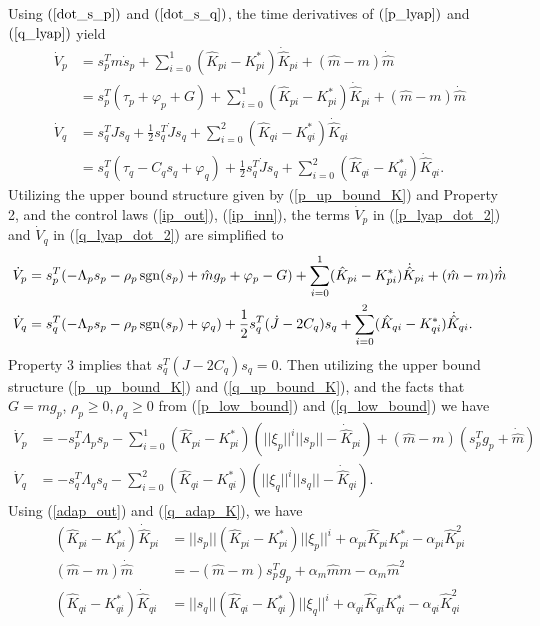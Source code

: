 Using $(\ref{dot_s_p})$ and $(\ref{dot_s_q})$, the time derivatives of $(\ref{p_lyap})$ and $(\ref{q_lyap})$ yield
\begin{align}
    \dot{V}_p &= s_p^T m \dot{s}_p + \sum \limits_{i=0}^{1} (\hat{K}_{pi} - K_{pi}^*) \dot{\hat{K}}_{pi} + (\hat{m} - m)\dot{\hat{m}} \nonumber \\
    &= s_p^T (\tau_p + \varphi_p + G )  + \sum \limits_{i=0}^{1} (\hat{K}_{pi} - K_{pi}^*) \dot{\hat{K}}_{pi} + (\hat{m} - m)\dot{\hat{m}} \label{p_lyap_dot_2} \\
    \dot{V}_q &= s_q^T J \dot{s}_q + \frac{1}{2}s_q^T \dot{J} s_q + \sum \limits_{i=0}^{2} (\hat{K}_{qi} - K_{qi}^*) \dot{\hat{K}}_{qi} \nonumber\\
    &= s_q^T (\tau_q - C_q s_q + \varphi_q) + \frac{1}{2}s_q^T \dot{J} s_q   + \sum \limits_{i=0}^{2} (\hat{K}_{qi} - K_{qi}^*) \dot{\hat{K}}_{qi}. \label{q_lyap_dot_2}
\end{align}
Utilizing the upper bound structure given by (\ref{p_up_bound_K}) and Property 2, and the control laws (\ref{ip_out}), (\ref{ip_inn}), the terms $\dot{V}_p$ in (\ref{p_lyap_dot_2}) and $\dot{V}_q$ in (\ref{q_lyap_dot_2}) are simplified to
\begin{align}
    \dot{V}_p &= s_p^T (- \Lambda_p s_p - \rho_p \operatorname{sgn}(s_p) + \hat{m} g_p + \varphi_p - G )  + \sum \limits_{i=0}^{1} (\hat{K}_{pi} - K_{pi}^*) \dot{\hat{K}}_{pi} + (\hat{m} - m)\dot{\hat{m}} \label{p_lyap_dot_3} \\
    \dot{V}_q &= s_q^T (- \Lambda_p s_p - \rho_p \operatorname{sgn}(s_p) + \varphi_q) + \frac{1}{2}s_q^T (\dot{J} - 2C_q) s_q + \sum \limits_{i=0}^{2} (\hat{K}_{qi} - K_{qi}^*) \dot{\hat{K}}_{qi}. \label{q_lyap_dot_3}
\end{align}
Property 3 implies that $s_q^T (J-2C_q) s_q = 0$. Then utilizing the upper bound structure (\ref{p_up_bound_K}) and (\ref{q_up_bound_K}), and the facts that $G=mg_p$, $\rho_p \geq 0, \rho_q \geq 0$ from (\ref{p_low_bound}) and (\ref{q_low_bound}) we have
\begin{align}
    \dot{V}_p &= - s_p^T \Lambda_p s_p - \sum \limits_{i=0}^{1} (\hat{K}_{pi} - K_{pi}^*) (||\xi_p||^i ||s_p|| - \dot{\hat{K}}_{pi}) + (\hat{m} - m)(s_p^Tg_p + \dot{\hat{m}}) \label{p_lyap_dot_4} \\ 
    \dot{V}_q &= - s_q^T \Lambda_q s_q - \sum \limits_{i=0}^{2} (\hat{K}_{qi} - K_{qi}^*) (||\xi_q||^i ||s_q|| -\dot{\hat{K}}_{qi}). \label{q_lyap_dot_4}
\end{align}
Using (\ref{adap_out}) and (\ref{q_adap_K}), we have
\begin{align}
    (\hat{K}_{pi} - K_{pi}^*) \dot{\hat{K}}_{pi} &= ||s_p|| (\hat{K}_{pi} - K_{pi}^*) ||\xi_p||^i  + \alpha_{pi} \hat{K}_{pi} K_{pi}^* - \alpha_{pi} \hat{K}_{pi}^2 \label{Kp_dot_exp}\\
    (\hat{m} - m) \dot{\hat{m}} &= - (\hat{m} - m) s_p^Tg_p  + \alpha_{m} \hat{m} m - \alpha_{m} \hat{m}^2 \label{m_dot_exp}\\
    (\hat{K}_{qi} - K_{qi}^*) \dot{\hat{K}}_{qi} &= ||s_q|| (\hat{K}_{qi} - K_{qi}^*) ||\xi_q||^i + \alpha_{qi} \hat{K}_{qi} K_{qi}^* - \alpha_{qi} \hat{K}_{qi}^2 \label{Kq_dot_exp}
\end{align}
